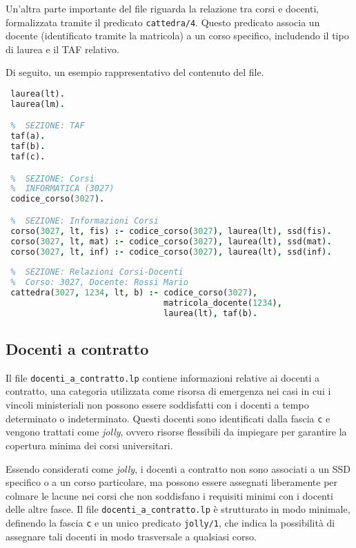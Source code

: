 Un'altra parte importante del file riguarda la relazione tra corsi e docenti, 
formalizzata tramite il predicato \texttt{cattedra/4}. Questo predicato associa 
un docente (identificato tramite la matricola) a un corso specifico, includendo 
il tipo di laurea e il TAF relativo. 

Di seguito, un esempio rappresentativo del contenuto del file.

\begin{lstlisting}[language=prolog, caption={Esempio struttura dati di \texttt{coperture.lp}.}]    
 %  SEZIONE: Tipi di Corso
 laurea(lt).
 laurea(lm).

 %  SEZIONE: TAF
 taf(a).
 taf(b).
 taf(c).

 %  SEZIONE: Corsi
 %  INFORMATICA (3027)
 codice_corso(3027).

 %  SEZIONE: Informazioni Corsi
 corso(3027, lt, fis) :- codice_corso(3027), laurea(lt), ssd(fis).
 corso(3027, lt, mat) :- codice_corso(3027), laurea(lt), ssd(mat).
 corso(3027, lt, inf) :- codice_corso(3027), laurea(lt), ssd(inf).
 
 %  SEZIONE: Relazioni Corsi-Docenti
 %  Corso: 3027, Docente: Rossi Mario
 cattedra(3027, 1234, lt, b) :- codice_corso(3027), 
                                matricola_docente(1234), 
                                laurea(lt), taf(b).

\end{lstlisting}


\subsection{Docenti a contratto}\label{sec:rules-docenti-contratto}

Il file \texttt{docenti\_a\_contratto.lp} contiene informazioni relative ai docenti a 
contratto, una categoria utilizzata come risorsa di emergenza nei casi in cui i vincoli 
ministeriali non possono essere soddisfatti con i docenti a tempo determinato o 
indeterminato. Questi docenti sono identificati dalla fascia \texttt{c} e vengono 
trattati come \textit{jolly}, ovvero risorse flessibili da impiegare per garantire la 
copertura minima dei corsi universitari.

Essendo considerati come \textit{jolly}, i docenti a contratto non sono associati a 
un SSD specifico o a un corso particolare, ma possono essere assegnati liberamente per 
colmare le lacune nei corsi che non soddisfano i requisiti minimi con i docenti delle 
altre fasce. Il file \texttt{docenti\_a\_contratto.lp} è strutturato in modo minimale, 
definendo la fascia \texttt{c} e un unico predicato \texttt{jolly/1}, che indica la 
possibilità di assegnare tali docenti in modo trasversale a qualsiasi corso.

